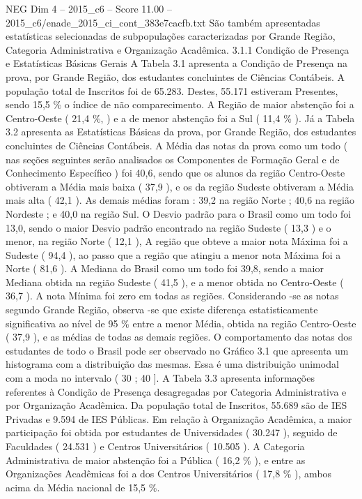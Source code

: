 \begin{textsample}{NEG Dim 4 – 2015\_c6 – Score 11.00 – 2015\_c6/enade\_2015\_ci\_cont\_383e7cacfb.txt}
São também apresentadas estatísticas selecionadas de subpopulações caracterizadas por Grande Região, Categoria Administrativa e Organização Acadêmica. 3.1.1 Condição de Presença e Estatísticas Básicas Gerais A Tabela 3.1 apresenta a Condição de Presença na prova, por Grande Região, dos estudantes concluintes de Ciências Contábeis.
A população total de Inscritos foi de 65.283.
Destes, 55.171 estiveram Presentes, sendo 15,5 \% o índice de não comparecimento.
A Região de maior abstenção foi a Centro-Oeste ( 21,4 \%, ) e a de menor abstenção foi a Sul ( 11,4 \% ).
Já a Tabela 3.2 apresenta as Estatísticas Básicas da prova, por Grande Região, dos estudantes concluintes de Ciências Contábeis.
A Média das notas da prova como um todo ( nas seções seguintes serão analisados os Componentes de Formação Geral e de Conhecimento Específico ) foi 40,6, sendo que os alunos da região Centro-Oeste obtiveram a Média mais baixa ( 37,9 ), e os da região Sudeste obtiveram a Média mais alta ( 42,1 ).
As demais médias foram : 39,2 na região Norte ; 40,6 na região Nordeste ; e 40,0 na região Sul.
O Desvio padrão para o Brasil como um todo foi 13,0, sendo o maior Desvio padrão encontrado na região Sudeste ( 13,3 ) e o menor, na região Norte ( 12,1 ), A região que obteve a maior nota Máxima foi a Sudeste ( 94,4 ), ao passo que a região que atingiu a menor nota Máxima foi a Norte ( 81,6 ).
A Mediana do Brasil como um todo foi 39,8, sendo a maior Mediana obtida na região Sudeste ( 41,5 ), e a menor obtida no Centro-Oeste ( 36,7 ).
A nota Mínima foi zero em todas as regiões.
Considerando -se as notas segundo Grande Região, observa -se que existe diferença estatisticamente significativa ao nível de 95 \% entre a menor Média, obtida na região Centro-Oeste ( 37,9 ), e as médias de todas as demais regiões.
O comportamento das notas dos estudantes de todo o Brasil pode ser observado no Gráfico 3.1 que apresenta um histograma com a distribuição das mesmas.
Essa é uma distribuição unimodal com a moda no intervalo ( 30 ; 40 ].
A Tabela 3.3 apresenta informações referentes à Condição de Presença desagregadas por Categoria Administrativa e por Organização Acadêmica.
Da população total de Inscritos, 55.689 são de IES Privadas e 9.594 de IES Públicas.
Em relação à Organização Acadêmica, a maior participação foi obtida por estudantes de Universidades ( 30.247 ), seguido de Faculdades ( 24.531 ) e Centros Universitários ( 10.505 ).
A Categoria Administrativa de maior abstenção foi a Pública ( 16,2 \% ), e entre as Organizações Acadêmicas foi a dos Centros Universitários ( 17,8 \% ), ambos acima da Média nacional de 15,5 \%.

\end{textsample}
